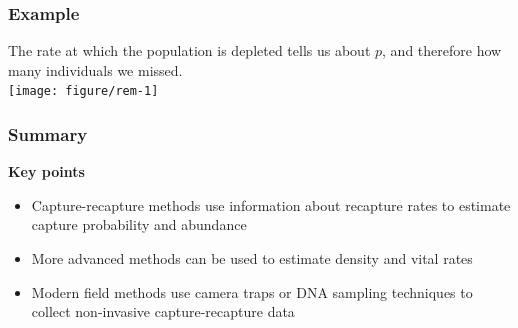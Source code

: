 \documentclass[color=usenames,dvipsnames]{beamer}\usepackage[]{graphicx}\usepackage[]{color}
\newenvironment{knitrout}{}{} %
\begin{document}
\begin{frame}[fragile]
  \frametitle{Example}
  \centering
    The rate at which the population is depleted tells us about $p$,
    and therefore how many individuals we missed. \\  
    \vfill
\begin{knitrout}
\color{fgcolor}
\texttt{[image: figure/rem-1]} 
\end{knitrout}
\end{frame}








\begin{frame}
  \frametitle{Summary}
  \large
  {\bf Key points}
  \begin{itemize}
    \item Capture-recapture methods use information about recapture
      rates to estimate capture probability and abundance
    \item More advanced methods can be used to estimate density and vital rates
    \item Modern field methods use camera traps or DNA sampling techniques to collect non-invasive capture-recapture data
  \end{itemize}
\end{frame}
\end{document}
